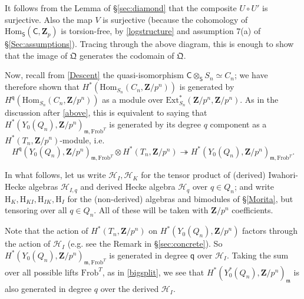 \documentclass[10pt]{amsart}
\newcommand{\Z}{\mathbf{Z}}
\newcommand{\Ext}{\mathrm{Ext}}
\newcommand{\Hom}{\mathrm{Hom}}
\newcommand{\Frob}{\mathrm{Frob}}
\newcommand{\Cinf}{\mathsf{C}}
\newcommand{\Sinf}{\mathsf{S}}
\theoremstyle{remark}
\newcommand{\BWq}{\mathsf{q}}
\begin{document}
 
%
%
%
%
%
%
%
%
%
%
%

     
    
It follows  from the Lemma of \S \ref{sec:diamond}  that the composite $U \circ U'$ is surjective.  
  Also the map $V$ is surjective (because the cohomology of $\Hom_{\Sinf}(\Cinf, \Z_p)$ is torsion-free, by \eqref{logstructure} and
  assumption 7(a) of \S \ref{Sec:assumptions}). 
    Tracing through the above diagram, this is enough to show that the image of  $\mathfrak{Q}$ generates the codomain of $\mathfrak{Q}$. 


Now,  recall  from \eqref{Descent} the quasi-isomorphism $\Cinf \otimes_{\Sinf} S_n  \simeq C_n$; 
    we have therefore shown that 
   $   H^*(\Hom_{S_n}(C_n, \Z/p^n))$  is generated  by $ H^{\BWq}(\Hom_{S_n}(C_n, \Z/p^n))$ as a module   over $\Ext^*_{S_n}(\Z/p^n, \Z/p^n) $.
   As in the discussion after \eqref{above}, this  is equivalent to saying that
 $H^*(Y_0(Q_n), \Z/p^n)_{\mathfrak{m},\Frob^T}$ is generated by  its degree $q$ component as a $H^*(T_n, \Z/p^n)$-module, i.e.  
\begin{equation} \label{bencumber}H^{\BWq}(Y_0(Q_n), \Z/p^n)_{\mathfrak{m}, \Frob^T} \otimes H^*(T_n,\Z/p^n) \twoheadrightarrow H^*(Y_0(Q_n),\Z/p^n)_{\mathfrak{m}, \Frob^T}.\end{equation}
   
      

 
%
%
%
%
%
%
%
%
%
%
%
%
%
%
%
%
%
%
%
%
%
%
%
%
%
%
%
%
%
%
%
%
%


%
%
%
%
%

%
%
%
%
%
%
%



\label{randompageref}
In what follows, let us write $\mathscr{H}_I, \mathscr{H}_K$ for the tensor product   
of (derived) Iwahori-Hecke algebras  $\mathscr{H}_{I,q}$ and derived Hecke algebra $\mathscr{H}_{q}$  over  $q \in Q_n$;
and write $\mathrm{H}_K, \mathrm{H}_{KI}, \mathrm{H}_{IK}, \mathrm{H}_I$ for the (non-derived) algebras and bimodules
of \S \ref{Morita}, but tensoring over all $q \in Q_n$.  All of these will be taken with $\Z/p^n$ coefficients. 
 
Note that the action of $H^*(T_ n, \Z/p^n)$  on $H^*(Y_0(Q_n), \Z/p^n)$ factors through the action of $\mathscr{H}_I$ (e.g. see the Remark in \S \ref{sec:concrete}). 
  So $H^*(Y_0(Q_n), \Z/p^n)_{\mathfrak{m}, \Frob^T}$ is    generated in degree  $\BWq$ over  $\mathscr{H}_I$. 
  Taking the sum over all possible lifts $\Frob^T$,  as in \eqref{bigsplit}, we see that
  $H^*(Y_0^*(Q_n), \Z/p^n)_{\mathfrak{m}}$
  is also generated in degree $q$ over the derived $\mathscr{H}_I$.   
  
\end{document}
